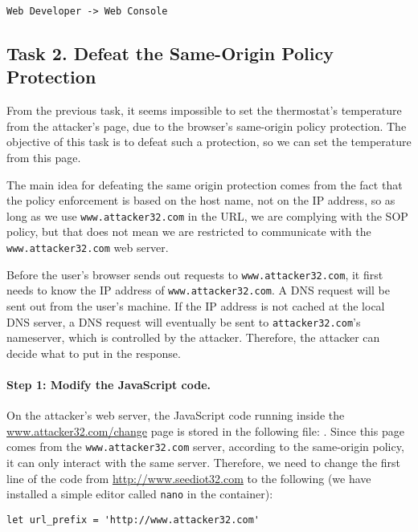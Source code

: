 \begin{lstlisting}
Web Developer -> Web Console
\end{lstlisting}
  


\subsection{Task 2. Defeat the Same-Origin Policy Protection}


From the previous task, it seems impossible to
set the thermostat's temperature from the attacker's
page, due to the browser's   
same-origin policy protection.  The objective of this task
is to defeat such a protection, so we can set the 
temperature from this page. 


The main idea for defeating the same origin protection 
comes from the fact that the policy enforcement is 
based on the host name, not on the IP address, so as long as 
we use \texttt{www.attacker32.com} in the URL, we are complying with
the SOP policy, but that does not mean we are restricted 
to communicate with the \texttt{www.attacker32.com} web server.  


Before the user's browser sends out requests to \texttt{www.attacker32.com},
it first needs to know the IP address of \texttt{www.attacker32.com}. 
A DNS request will be sent out from the user's machine. If the 
IP address is not cached at the local DNS server, a DNS request will
eventually be sent to \texttt{attacker32.com}'s  nameserver, which 
is controlled by the attacker. 
Therefore, the attacker can decide what to put in the response. 


\paragraph{Step 1: Modify the JavaScript code.}
On the attacker's web server, the JavaScript code running inside the 
\url{www.attacker32.com/change} page is 
stored in the following file: 
. Since this page
comes from the \texttt{www.attacker32.com} server, 
according to the same-origin policy, it can only
interact with the same server. Therefore, we need to change the first 
line of the code from \url{http://www.seediot32.com} 
to the following (we have installed a simple editor called \texttt{nano}
in the container):

\begin{lstlisting}
let url_prefix = 'http://www.attacker32.com'
\end{lstlisting}
 

